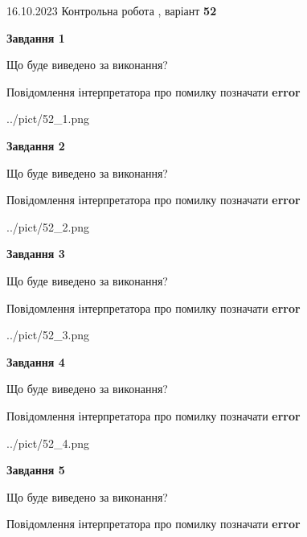 \documentclass[12pt, ukrainian]{article}
\begin{document}
{\Large{16.10.2023 Контрольна робота , варіант  \No \textbf { 52 }\par}}
{
\begin {large}
{\begin {center}\textbf{Завдання 1}\end {center}}\par
Що буде виведено за виконання? \par
Повідомлення інтерпретатора про помилку позначати \textbf{error}

\begin{center}
	{../pict/52_1.png}
\end{center}
\newpage

{\begin {center}\textbf{Завдання 2}\end {center}}\par
Що буде виведено за виконання? \par
Повідомлення інтерпретатора про помилку позначати \textbf{error}

\begin{center}
	{../pict/52_2.png}
\end{center}
\newpage

{\begin {center}\textbf{Завдання 3}\end {center}}\par
Що буде виведено за виконання? \par
Повідомлення інтерпретатора про помилку позначати \textbf{error}

\begin{center}
	{../pict/52_3.png}
\end{center}
\newpage

{\begin {center}\textbf{Завдання 4}\end {center}}\par
Що буде виведено за виконання? \par
Повідомлення інтерпретатора про помилку позначати \textbf{error}

\begin{center}
	{../pict/52_4.png}
\end{center}
\newpage

{\begin {center}\textbf{Завдання 5}\end {center}}\par
Що буде виведено за виконання? \par
Повідомлення інтерпретатора про помилку позначати \textbf{error}


\end{large}}
\end{document}
